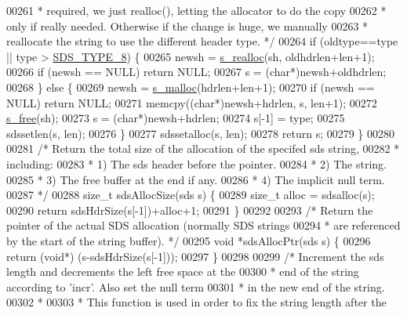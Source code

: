 \begin{DoxyCode}
{00261 \textcolor{comment}{     * required, we just realloc(), letting the allocator to do the copy}
00262 \textcolor{comment}{     * only if really needed. Otherwise if the change is huge, we manually}
00263 \textcolor{comment}{     * reallocate the string to use the different header type. */}
00264     \textcolor{keywordflow}{if} (oldtype==type || type > \hyperlink{sds_8h_a504136356f04bfa2fd616dd4c8fdd71c}{SDS\_TYPE\_8}) \{
00265         newsh = \hyperlink{sdsalloc_8h_a86d1b352c4e2c2848948649747bd296a}{s\_realloc}(sh, oldhdrlen+len+1);
00266         \textcolor{keywordflow}{if} (newsh == NULL) \textcolor{keywordflow}{return} NULL;
00267         s = (\textcolor{keywordtype}{char}*)newsh+oldhdrlen;
00268     \} \textcolor{keywordflow}{else} \{
00269         newsh = \hyperlink{sdsalloc_8h_a41e8c1188dca30db85c410c25fb417b6}{s\_malloc}(hdrlen+len+1);
00270         \textcolor{keywordflow}{if} (newsh == NULL) \textcolor{keywordflow}{return} NULL;
00271         memcpy((\textcolor{keywordtype}{char}*)newsh+hdrlen, s, len+1);
00272         \hyperlink{sdsalloc_8h_aa06cb49194c292098a753d87e2ac6b71}{s\_free}(sh);
00273         s = (\textcolor{keywordtype}{char}*)newsh+hdrlen;
00274         s[-1] = type;
00275         sdssetlen(s, len);
00276     \}
00277     sdssetalloc(s, len);
00278     \textcolor{keywordflow}{return} s;
00279 \}
00280 
00281 \textcolor{comment}{/* Return the total size of the allocation of the specifed sds string,}
00282 \textcolor{comment}{ * including:}
00283 \textcolor{comment}{ * 1) The sds header before the pointer.}
00284 \textcolor{comment}{ * 2) The string.}
00285 \textcolor{comment}{ * 3) The free buffer at the end if any.}
00286 \textcolor{comment}{ * 4) The implicit null term.}
00287 \textcolor{comment}{ */}
00288 size\_t sdsAllocSize(sds s) \{
00289     size\_t alloc = sdsalloc(s);
00290     \textcolor{keywordflow}{return} sdsHdrSize(s[-1])+alloc+1;
00291 \}
00292 
00293 \textcolor{comment}{/* Return the pointer of the actual SDS allocation (normally SDS strings}
00294 \textcolor{comment}{ * are referenced by the start of the string buffer). */}
00295 \textcolor{keywordtype}{void} *sdsAllocPtr(sds s) \{
00296     \textcolor{keywordflow}{return} (\textcolor{keywordtype}{void}*) (s-sdsHdrSize(s[-1]));
00297 \}
00298 
00299 \textcolor{comment}{/* Increment the sds length and decrements the left free space at the}
00300 \textcolor{comment}{ * end of the string according to 'incr'. Also set the null term}
00301 \textcolor{comment}{ * in the new end of the string.}
00302 \textcolor{comment}{ *}
00303 \textcolor{comment}{ * This function is used in order to fix the string length after the}
}
\end{DoxyCode}
